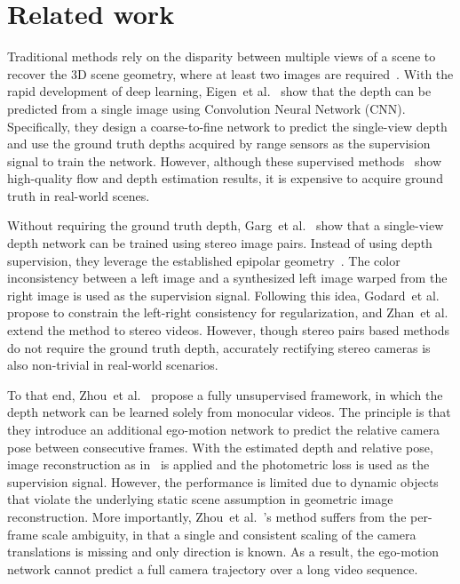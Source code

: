 \documentclass{article}
\def\etal{et al.}
\begin{document}
\section{Related work}

Traditional methods rely on the disparity between multiple views of a scene to recover the 3D scene geometry,
where at least two images are required~\cite{hartley2003multiple}.
With the rapid development of deep learning,
Eigen~\etal~\cite{eigen2014depth} show that the depth can be predicted from a single image using Convolution Neural Network (CNN).
Specifically, they design a coarse-to-fine network to predict the single-view depth and use the ground truth depths acquired by range sensors as the supervision signal to train the network.
However, although these supervised methods~\cite{eigen2014depth, liu2016learning, kuznietsov2017semi, tang2018ba, yin2018hierarchical, Yin2019enforcing} show high-quality flow and depth estimation results, it is expensive to acquire ground truth in real-world scenes.

Without requiring the ground truth depth, Garg~\etal~\cite{garg2016unsupervised} show that a single-view depth network can be trained using stereo image pairs.
Instead of using depth supervision, they leverage the established epipolar geometry~\cite{hartley2003multiple}. 
The color inconsistency between a left image and a synthesized left image warped from the right image is used as the supervision signal.
Following this idea, Godard~\etal~\cite{godard2017unsupervised} propose to constrain the left-right consistency for regularization, and Zhan~\etal~\cite{zhan2018unsupervised} extend the method to stereo videos.
However, though stereo pairs based methods do not require the ground truth depth, accurately rectifying stereo cameras is also non-trivial in real-world scenarios.


To that end, Zhou~\etal~\cite{zhou2017unsupervised} propose a fully unsupervised framework, in which the depth network can be learned solely from monocular videos.
The principle is that they introduce an additional ego-motion network to predict the relative camera pose between consecutive frames.
With the estimated depth and relative pose, image reconstruction as in~\cite{garg2016unsupervised} is applied and the photometric loss is used as the supervision signal.
However, the performance is limited due to dynamic objects that violate the underlying static scene assumption in geometric image reconstruction.
More importantly, Zhou~\etal~\cite{zhou2017unsupervised}'s method suffers from the per-frame scale ambiguity, in that a single and consistent scaling of the camera translations is missing and only direction is known.
As a result, the ego-motion network cannot predict a full camera trajectory over a long video sequence.
\end{document}
